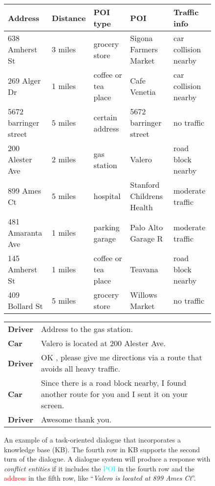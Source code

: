 \documentclass[11pt,a4paper]{article}
\begin{document}
	\begin{figure}[t]
	\centering
\begin{adjustbox}{width=0.48\textwidth}
		\begin{tabular}{|l|l|l|l|l|}
			\hline\textbf{Address} & \textbf{Distance} & \textbf{POI type} & \textbf{POI} & \textbf{Traffic info} \\\hline
			638 Amherst St&3 miles&grocery store&Sigona Farmers Market&car collision nearby\\
			269 Alger Dr&1 miles&coffee or tea place&Cafe Venetia&car collision nearby\\
			5672 barringer street & 5 miles & certain address & 5672 barringer street & no traffic \\
			\rowcolor{mycyan}200 Alester Ave&2 miles&gas station&Valero&road block nearby\\
			\cellcolor{myred}899 Ames Ct&5 miles&hospital&Stanford Childrens Health&moderate traffic\\
			481 Amaranta Ave&1 miles&parking garage&Palo Alto Garage R&moderate traffic\\
			145 Amherst St&1 miles&coffee or tea place&Teavana&road block nearby\\
			409 Bollard St&5 miles&grocery store&Willows Market&no traffic\\\hline
		\end{tabular}
	\end{adjustbox}
	\newline
	\vspace{0.25em}
	\newline
	\begin{adjustbox}{width=0.48\textwidth}
		\begin{tabular}{ll}
			\textbf{Driver} & Address to the gas station.\\
			\textbf{Car} & Valero is located at 200 Alester Ave.\\
			\textbf{Driver} & OK , please give me directions via a route that avoids all heavy traffic.\\
			\textbf{Car} & Since there is a road block nearby, I found another route for you and I sent it on your screen.\\
			\textbf{Driver} & Awesome thank you.\\ 
		\end{tabular}
	\end{adjustbox}
	\caption{
		An example of a task-oriented dialogue that incorporates a knowledge base (KB). 
		The fourth row in KB supports the second turn of the dialogue. 
		A dialogue system will produce a response with \textit{conflict entities} if it includes the \textcolor{cyan}{POI} in the fourth row
		and the \textcolor{red}{address} in the fifth row, like ``\textit{Valero is located at 899 Ames Ct}''.
	}
	\label{fig:example}
\end{figure}
\end{document}

